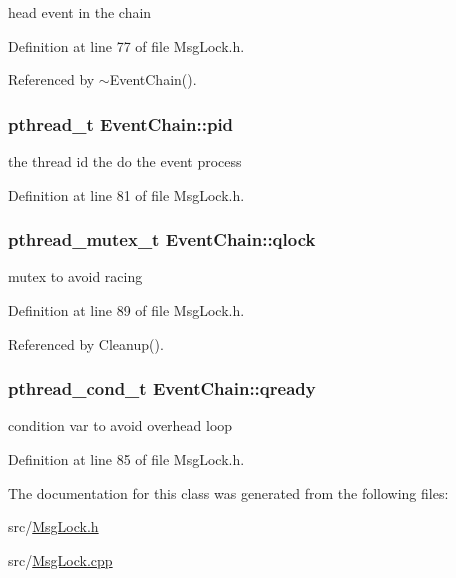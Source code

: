 head event in the chain 



\-Definition at line 77 of file \-Msg\-Lock.\-h.



\-Referenced by $\sim$\-Event\-Chain().

\hypertarget{classEventChain_a18d260ab11be32921c0048f9baee010f}{
\subsubsection[{pid}]{\setlength{\rightskip}{0pt plus 5cm}pthread\-\_\-t {\bf \-Event\-Chain\-::pid}}}\label{df/dd4/classEventChain_a18d260ab11be32921c0048f9baee010f}


the thread id the do the event process 



\-Definition at line 81 of file \-Msg\-Lock.\-h.

\hypertarget{classEventChain_ade765e56690d9ed14ade46e379a52680}{
\subsubsection[{qlock}]{\setlength{\rightskip}{0pt plus 5cm}pthread\-\_\-mutex\-\_\-t {\bf \-Event\-Chain\-::qlock}}}\label{df/dd4/classEventChain_ade765e56690d9ed14ade46e379a52680}


mutex to avoid racing 



\-Definition at line 89 of file \-Msg\-Lock.\-h.



\-Referenced by \-Cleanup().

\hypertarget{classEventChain_a07bb206a91428aa03e3167760357bc57}{
\subsubsection[{qready}]{\setlength{\rightskip}{0pt plus 5cm}pthread\-\_\-cond\-\_\-t {\bf \-Event\-Chain\-::qready}}}\label{df/dd4/classEventChain_a07bb206a91428aa03e3167760357bc57}


condition var to avoid overhead loop 



\-Definition at line 85 of file \-Msg\-Lock.\-h.



\-The documentation for this class was generated from the following files\-:\begin{DoxyCompactItemize}
\item 
src/\hyperlink{MsgLock_8h}{\-Msg\-Lock.\-h}\item 
src/\hyperlink{MsgLock_8cpp}{\-Msg\-Lock.\-cpp}\end{DoxyCompactItemize}
